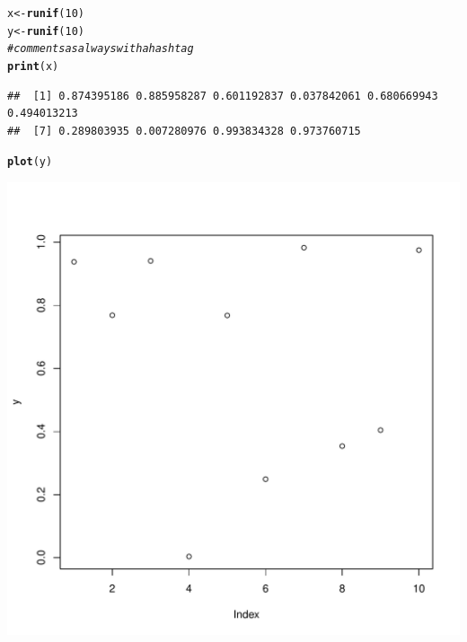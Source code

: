 \documentclass{article}\usepackage[]{graphicx}\usepackage[]{color}
\makeatletter
\def\maxwidth{ %
  \ifdim\Gin@nat@width>\linewidth
    \linewidth
  \else
    \Gin@nat@width
  \fi
}
\newcommand{\hlnum}[1]{\textcolor[rgb]{0.686,0.059,0.569}{#1}}%
\newcommand{\hlcom}[1]{\textcolor[rgb]{0.678,0.584,0.686}{\textit{#1}}}%
\newcommand{\hlstd}[1]{\textcolor[rgb]{0.345,0.345,0.345}{#1}}%
\newcommand{\hlkwb}[1]{\textcolor[rgb]{0.69,0.353,0.396}{#1}}%
\newcommand{\hlkwd}[1]{\textcolor[rgb]{0.737,0.353,0.396}{\textbf{#1}}}%
\newenvironment{kframe}{%
 \def\at@end@of@kframe{}%
 \ifinner\ifhmode%
  \def\at@end@of@kframe{\end{minipage}}%
  \begin{minipage}{\columnwidth}%
 \fi\fi%
 \def\FrameCommand##1{\hskip\@totalleftmargin \hskip-\fboxsep
 \colorbox{shadecolor}{##1}\hskip-\fboxsep
     \hskip-\linewidth \hskip-\@totalleftmargin \hskip\columnwidth}%
 \MakeFramed {\advance\hsize-\width
   \@totalleftmargin\z@ \linewidth\hsize
   \@setminipage}}%
 {\par\unskip\endMakeFramed%
 \at@end@of@kframe}
\newenvironment{knitrout}{}{} %
\makeatother
\begin{document}
\begin{knitrout}
\color{fgcolor}\begin{kframe}
\begin{alltt}
\hlstd{x} \hlkwb{<-} \hlkwd{runif}\hlstd{(}\hlnum{10}\hlstd{)}
\hlstd{y} \hlkwb{<-} \hlkwd{runif}\hlstd{(}\hlnum{10}\hlstd{)}
\hlcom{# comments as always with a hash tag}
\hlkwd{print}\hlstd{(x)}
\end{alltt}
\begin{verbatim}
##  [1] 0.874395186 0.885958287 0.601192837 0.037842061 0.680669943 0.494013213
##  [7] 0.289803935 0.007280976 0.993834328 0.973760715
\end{verbatim}
\begin{alltt}
\hlkwd{plot}\hlstd{(y)}
\end{alltt}
\end{kframe}
\includegraphics[width=\maxwidth]{figure/unnamed-chunk-1-1} 

\end{knitrout}
\end{document}
